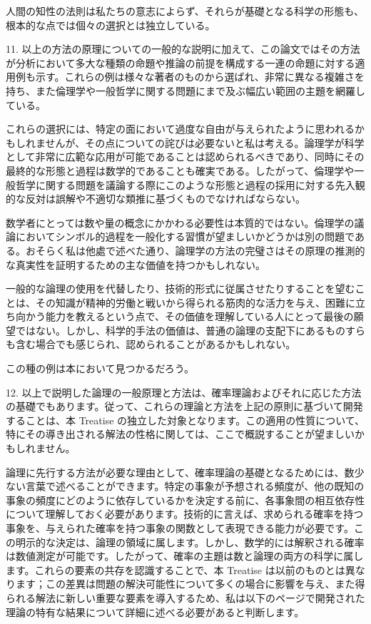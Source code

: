 \documentclass[a4paper,11pt,openany]{ltjsbook}
\begin{document}
人間の知性の法則は私たちの意志によらず、それらが基礎となる科学の形態も、根本的な点では個々の選択とは独立している。

11. 以上の方法の原理についての一般的な説明に加えて、この論文ではその方法が分析において多大な種類の命題や推論の前提を構成する一連の命題に対する適用例も示す。これらの例は様々な著者のものから選ばれ、非常に異なる複雑さを持ち、また倫理学や一般哲学に関する問題にまで及ぶ幅広い範囲の主題を網羅している。

これらの選択には、特定の面において過度な自由が与えられたように思われるかもしれませんが、その点についての詫びは必要ないと私は考える。論理学が科学として非常に広範な応用が可能であることは認められるべきであり、同時にその最終的な形態と過程は数学的であることも確実である。したがって、倫理学や一般哲学に関する問題を議論する際にこのような形態と過程の採用に対する先入観的な反対は誤解や不適切な類推に基づくものでなければならない。

数学者にとっては数や量の概念にかかわる必要性は本質的ではない。倫理学の議論においてシンボル的過程を一般化する習慣が望ましいかどうかは別の問題である。おそらく私は他處で述べた通り、論理学の方法の完璧さはその原理の推測的な真実性を証明するための主な価値を持つかもしれない。

一般的な論理の使用を代替したり、技術的形式に従属させたりすることを望むことは、その知識が精神的労働と戦いから得られる筋肉的な活力を与え、困難に立ち向かう能力を教えるという点で、その価値を理解している人にとって最後の願望ではない。しかし、科学的手法の価値は、普通の論理の支配下にあるものすらも含む場合でも感じられ、認められることがあるかもしれない。

この種の例は本において見つかるだろう。

12. 以上で説明した論理の一般原理と方法は、確率理論およびそれに応じた方法の基礎でもあります。従って、これらの理論と方法を上記の原則に基づいて開発することは、本 Treatise の独立した対象となります。この適用の性質について、特にその導き出される解法の性格に関しては、ここで概説することが望ましいかもしれません。

論理に先行する方法が必要な理由として、確率理論の基礎となるためには、数少ない言葉で述べることができます。特定の事象が予想される頻度が、他の既知の事象の頻度にどのように依存しているかを決定する前に、各事象間の相互依存性について理解しておく必要があります。技術的に言えば、求められる確率を持つ事象を、与えられた確率を持つ事象の関数として表現できる能力が必要です。この明示的な決定は、論理の領域に属します。しかし、数学的には解釈される確率は数値測定が可能です。したがって、確率の主題は数と論理の両方の科学に属します。これらの要素の共存を認識することで、本 Treatise は以前のものとは異なります；この差異は問題の解決可能性について多くの場合に影響を与え、また得られる解法に新しい重要な要素を導入するため、私は以下のページで開発された理論の特有な結果について詳細に述べる必要があると判断します。
\end{document}
